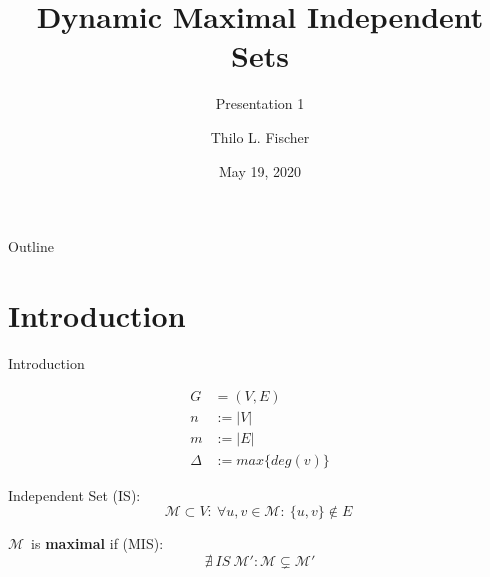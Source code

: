 \documentclass{beamer}
\title{Dynamic Maximal Independent Sets}
\subtitle{Presentation 1}
\author{Thilo L. Fischer}
\date{May 19, 2020}
\newcommand{\M}{$\mathcal{M}$}
\begin{document}
\begin{frame}
  \titlepage
\end{frame}

\begin{frame}{Outline}
  \tableofcontents
\end{frame}

\section{Introduction}
\begin{frame}{Introduction}

  \begin{equation*} 
    \begin{split} 
      G &= (V, E) \\
      n &:= \vert V \vert \\
      m &:= \vert E \vert \\
      \Delta &:= max\{deg(v)\}
    \end{split}
  \end{equation*}

  Independent Set (IS):
  \begin{equation*}
    \mathcal{M} \subset V:\ \forall u, v \in \mathcal{M}:\ \{u, v\} \notin E\
  \end{equation*}

  \M\ is \textbf{maximal} if (MIS):
  \begin{equation*}
     \nexists \  IS \ \mathcal{M'}: \mathcal{M} \subsetneq \mathcal{M'}
  \end{equation*}

\end{frame}
\end{document}
